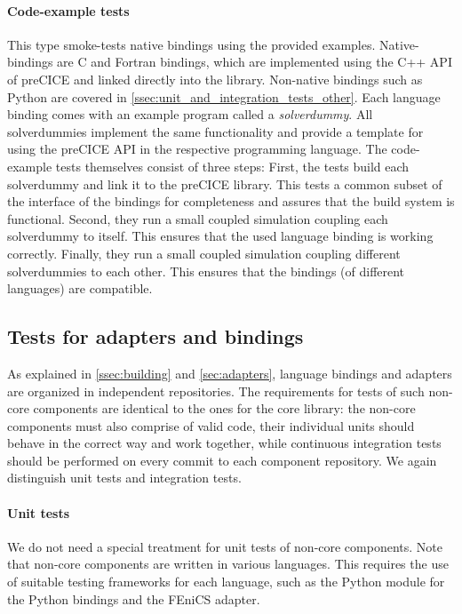 \paragraph{Code-example tests} This type smoke-tests native bindings using the provided examples.
Native-bindings are C and Fortran bindings, which are implemented using the C++ API of preCICE and linked directly into the library.
Non-native bindings such as Python are covered in \autoref{ssec:unit_and_integration_tests_other}.
Each language binding comes with an example program called a \emph{solverdummy}. All solverdummies implement the same functionality and provide a template for using the preCICE API in the respective programming language.
The code-example tests themselves consist of three steps:
First, the tests build each solverdummy and link it to the preCICE library. This tests a common subset of the interface of the bindings for completeness and assures that the build system is functional.
Second, they run a small coupled simulation coupling each solverdummy to itself. This ensures that the used language binding is working correctly.
Finally, they run a small coupled simulation coupling different solverdummies to each other. This ensures that the bindings (of different languages) are compatible.

\subsection{Tests for adapters and bindings}
\label{ssec:unit_and_integration_tests_other}

As explained in \autoref{ssec:building} and \autoref{sec:adapters}, language bindings and adapters are organized in independent repositories. The requirements for tests of such non-core components are identical to the ones for the core library: the non-core components must also comprise of valid code, their individual units should behave in the correct way and work together, while continuous integration tests should be performed on every commit to each component repository. We again distinguish unit tests and integration tests.

\paragraph{Unit tests} We do not need a special treatment for unit tests of non-core components. Note that non-core components are written in various languages. This requires the use of suitable testing frameworks for each language, such as the Python module  for the Python bindings and the FEniCS adapter.

